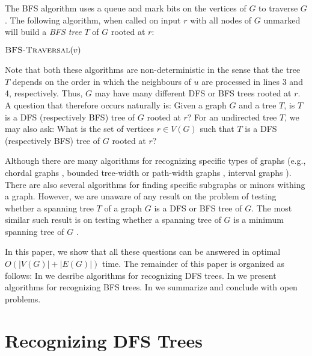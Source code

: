 \documentclass[lotsofwhite]{patmorin}
\newcommand{\bfst}{\textsc{BFS-Traversal}}
\begin{document}
The BFS algorithm uses a queue and mark bits on the vertices of $G$ to
traverse $G$.  The following algorithm, when called on input $r$ with
all nodes of $G$ unmarked will build a \emph{BFS tree} $T$ of $G$
rooted at $r$:

\noindent
\begin{minipage}{\textwidth}
$\bfst(v)$
\begin{algorithmic}[1]
  \ENDWHILE
\ENDWHILE
\end{algorithmic}
\end{minipage}

Note that both these algorithms are non-deterministic in the sense
that the tree $T$ depends on the order in which the neighbours of $u$
are processed in lines 3 and 4, respectively.  Thus, $G$ may have many
different DFS or BFS trees rooted at $r$.  A question that therefore
occurs naturally is: Given a graph $G$ and a tree $T$, is $T$ is a DFS
(respectively BFS) tree of $G$ rooted at $r$?  For an undirected tree
$T$, we may also ask: What is the set of vertices $r\in V(G)$ such
that $T$ is a DFS (respectively BFS) tree of $G$ rooted at $r$?

Although there are many algorithms for recognizing specific types of
graphs (e.g., chordal graphs \cite{X}, bounded tree-width or
path-width graphs \cite{X}, interval graphs \cite{X}).  There are also
several algorithms for finding specific subgraphs \cite{X} or minors
\cite{X} withing a graph.  However, we are unaware of any result on
the problem of testing whether a spanning tree $T$ of a graph $G$ is a
DFS or BFS tree of $G$.  The most similar such result is on testing
whether a spanning tree of $G$ is a minimum spanning tree of $G$
\cite{X}.

In this paper, we show that all these questions can be answered in
optimal $O(|V(G)|+|E(G)|)$ time.  The remainder of this paper is
organized as follows: In  we desribe algorithms for
recognizing DFS trees.  In  we present algorithms for
recognizing BFS trees.  In  we summarize and
conclude with open problems.

\section{Recognizing DFS Trees}
\end{document}
